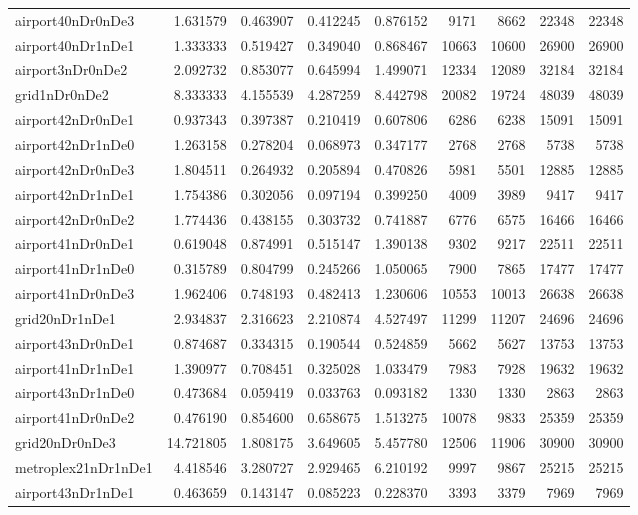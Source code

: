 \begin{longtable}{|l|r|r|r|r|r|r|r|r|}
airport40nDr0nDe3 & 1.631579 & 0.463907 & 0.412245 & 0.876152 & 9171 & 8662 & 22348 & 22348 \\
airport40nDr1nDe1 & 1.333333 & 0.519427 & 0.349040 & 0.868467 & 10663 & 10600 & 26900 & 26900 \\
airport3nDr0nDe2 & 2.092732 & 0.853077 & 0.645994 & 1.499071 & 12334 & 12089 & 32184 & 32184 \\
grid1nDr0nDe2 & 8.333333 & 4.155539 & 4.287259 & 8.442798 & 20082 & 19724 & 48039 & 48039 \\
airport42nDr0nDe1 & 0.937343 & 0.397387 & 0.210419 & 0.607806 & 6286 & 6238 & 15091 & 15091 \\
airport42nDr1nDe0 & 1.263158 & 0.278204 & 0.068973 & 0.347177 & 2768 & 2768 & 5738 & 5738 \\
airport42nDr0nDe3 & 1.804511 & 0.264932 & 0.205894 & 0.470826 & 5981 & 5501 & 12885 & 12885 \\
airport42nDr1nDe1 & 1.754386 & 0.302056 & 0.097194 & 0.399250 & 4009 & 3989 & 9417 & 9417 \\
airport42nDr0nDe2 & 1.774436 & 0.438155 & 0.303732 & 0.741887 & 6776 & 6575 & 16466 & 16466 \\
airport41nDr0nDe1 & 0.619048 & 0.874991 & 0.515147 & 1.390138 & 9302 & 9217 & 22511 & 22511 \\
airport41nDr1nDe0 & 0.315789 & 0.804799 & 0.245266 & 1.050065 & 7900 & 7865 & 17477 & 17477 \\
airport41nDr0nDe3 & 1.962406 & 0.748193 & 0.482413 & 1.230606 & 10553 & 10013 & 26638 & 26638 \\
grid20nDr1nDe1 & 2.934837 & 2.316623 & 2.210874 & 4.527497 & 11299 & 11207 & 24696 & 24696 \\
airport43nDr0nDe1 & 0.874687 & 0.334315 & 0.190544 & 0.524859 & 5662 & 5627 & 13753 & 13753 \\
airport41nDr1nDe1 & 1.390977 & 0.708451 & 0.325028 & 1.033479 & 7983 & 7928 & 19632 & 19632 \\
airport43nDr1nDe0 & 0.473684 & 0.059419 & 0.033763 & 0.093182 & 1330 & 1330 & 2863 & 2863 \\
airport41nDr0nDe2 & 0.476190 & 0.854600 & 0.658675 & 1.513275 & 10078 & 9833 & 25359 & 25359 \\
grid20nDr0nDe3 & 14.721805 & 1.808175 & 3.649605 & 5.457780 & 12506 & 11906 & 30900 & 30900 \\
metroplex21nDr1nDe1 & 4.418546 & 3.280727 & 2.929465 & 6.210192 & 9997 & 9867 & 25215 & 25215 \\
airport43nDr1nDe1 & 0.463659 & 0.143147 & 0.085223 & 0.228370 & 3393 & 3379 & 7969 & 7969 \\

\end{longtable}
